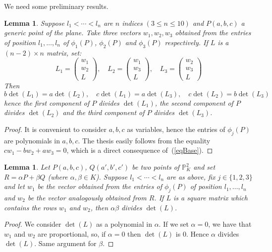 \documentclass{amsart}
\theoremstyle{plain}
\newtheorem{lemma}[theorem]{Lemma}
\theoremstyle{definition}
\begin{document}
We need some preliminary results.

\begin{lemma} Suppose $l_1< \cdots <l_n$ are
  $n$ indices $(3 \leq n \leq 10)$ and $P(a, b, c)$ a generic point of
  the plane. Take three vectors $w_1, w_2, w_3$
  obtained from the entries of position $l_1, \dots, l_n$
  of $\phi_1(P)$, $\phi_2(P)$ and $\phi_3(P)$ respectively.
  If $L$ is a $(n-2) \times n$ matrix, set:
  \[
  L_1 = \left(\begin{array}{c}w_1 \\ w_2 \\ L\end{array}  \right), \quad
  L_2 = \left(\begin{array}{c}w_1 \\ w_3 \\ L\end{array}  \right), \quad
  L_3 = \left(\begin{array}{c}w_2 \\ w_3 \\ L\end{array}  \right)
  \]
  Then
  \[
  b \det(L_1) = a \det(L_2), \quad  
  c \det(L_1) = a \det(L_3), \quad  
  c \det(L_2) = b \det(L_3)
  \]
  hence the first component of $P$ divides $\det(L_1)$, the second
  component of $P$ divides $\det(L_2)$ and the third component of
  $P$ divides $\det(L_3)$.
  \label{lemma1}
\end{lemma}
\begin{proof} It is convenient to consider $a, b, c$ as variables, hence
  the entries of $\phi_j(P)$ are polynomials in $a, b, c$.
  The thesis easily follows from the equality $c w_1-b w_2+a w_3 = 0$, which
  is a direct consequence of~(\ref{eqBase}). 
\end{proof}

\begin{lemma}
  Let $P(a, b, c)$, $Q(a', b', c')$ be two points of $\mathbb{P}^2_K$
  and set $R = \alpha P+\beta Q$ (where $\alpha, \beta \in K$). 
  Suppose $l_1 < \cdots < l_n$ are as above, fix $j \in \{1, 2, 3\}$
  and   let $w_1$ be the vector obtained
  from the entries of $\phi_j(P)$ of position $l_1, \dots, l_n$ 
  and $w_2$ be the vector analogously obtained from $R$. If 
  $L$ is a square matrix which contains the
  rows $w_1$ and $w_2$, then $\alpha\beta$ divides $\det(L)$.
  \label{lemma2}
\end{lemma}
\begin{proof}
  We consider $\det(L)$ as a polynomial in $\alpha$.
  If we set $\alpha = 0$,
  we have that $w_1$ and $w_2$ are proportional, so, if $\alpha = 0$
  then $\det(L)$ is $0$. Hence $\alpha$ divides $\det(L)$. Same
  argument for $\beta$. 
\end{proof}
\end{document}
